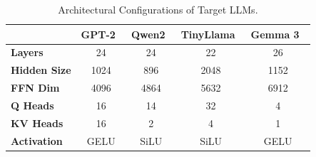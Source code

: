 \documentclass[9pt,conference]{IEEEtran}
\begin{document}
\begin{table}[t]
\centering
\caption{Architectural Configurations of Target LLMs.}
\label{tab:target_models}
\footnotesize
\renewcommand{\arraystretch}{0.80}
\setlength{\aboverulesep}{0.25ex}
\setlength{\belowrulesep}{0.25ex}
\setlength{\tabcolsep}{2pt}
\begin{tabular*}{\columnwidth}{@{\extracolsep{\fill}}lcccc@{}}
\toprule
& \textbf{GPT-2~\cite{gpt2}}
& \textbf{Qwen2~\cite{qwen2}}
& \textbf{TinyLlama~\cite{tinyllama}}
& \textbf{Gemma 3~\cite{gemma3}} \\
\midrule
\textbf{Layers}     & 24   & 24   & 22   & 26   \\
\midrule
\textbf{Hidden Size}& 1024 & 896  & 2048 & 1152 \\
\midrule
\textbf{FFN Dim}    & 4096 & 4864 & 5632 & 6912 \\
\midrule
\textbf{Q Heads}    & 16   & 14   & 32   & 4    \\
\midrule
\textbf{KV Heads}   & 16   & 2    & 4    & 1    \\
\midrule
\textbf{Activation} & GELU & SiLU & SiLU & GELU \\
\bottomrule
\end{tabular*}
\vspace{-6pt}
\end{table}
\end{document}
